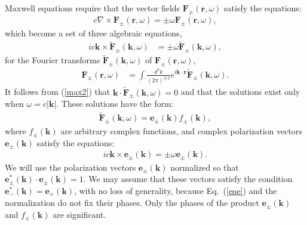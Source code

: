 \documentclass[onecolumn,aps,pra,12pt]{revtex4-1}
\begin{document}
Maxwell equations require that the vector fields ${\bm F}_\pm({\bm r},\omega)$ satisfy the equations:
\begin{align}\label{max1}
c\nabla\times{\bm F}_\pm({\bm r},\omega)=\pm\omega{\bm F}_\pm({\bm r},\omega),
\end{align}
which become a set of three algebraic equations,
\begin{align}\label{max2}
ic{\bm k}\times{\bm{\tilde{F}}}_\pm({\bm k},\omega)&=\pm\omega{\bm{\tilde{F}}}_\pm({\bm k},\omega),
\end{align}
for the Fourier transforms $\bm{\tilde{F}}_\pm({\bm k},\omega)$ of ${\bm F}_\pm({\bm r},\omega)$,
\begin{align}\label{max3}
{\bm F}_\pm({\bm r},\omega)&=\int\!\frac{d^3k}{(2\pi)^{3/2}}e^{i{{\bm k}\cdot{\bm r}}}\bm{\tilde{F}}_\pm({\bm k},\omega).
\end{align}
It follows from (\ref{max2}) that ${\bm k}\!\cdot\!{\bm{\tilde{F}}}_\pm({\bm k},\omega)=0$ and that the solutions exist only when $\omega=c|{\bm k}|$. These solutions have the form:
\begin{align}\label{fin0}
{\bm{\tilde{F}}}_\pm({\bm k},\omega)={\bm e}_\pm({\bm k})f_\pm({\bm k}),
\end{align}
where $f_\pm({\bm k})$ are arbitrary complex functions, and complex polarization vectors ${\bm e}_\pm({\bm k})$ satisfy the equations:
\begin{align}\label{eqe}
ic{\bm k}\times{\bm e}_\pm({\bm k})=\pm\omega{\bm e}_\pm({\bm k}).
\end{align}
We will use the polarization vectors ${\bm e}_\pm({\bm k})$ normalized so that ${\bm e}^*_\pm({\bm k})\cdot{\bm e}_\pm({\bm k})=1$. We may assume that these vectors satisfy the condition ${\bm e}^*_-({\bm k})={\bm e}_+({\bm k})$, with no loss of generality, because Eq.~(\ref{eqe}) and the normalization do not fix their phases. Only the phases of the product ${\bm e}_\pm({\bm k})$ and $f_\pm({\bm k})$ are significant.
\end{document}

